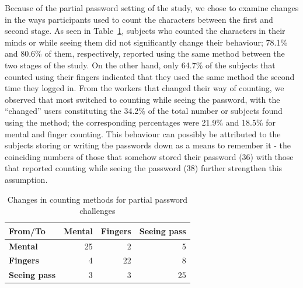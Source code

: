     Because of the partial password setting of the study, we chose to examine changes in the ways participants used to count the characters between the first and second stage. As seen in Table~\ref{tab:counting_changes}, subjects who counted the characters in their minds or while seeing them did not significantly change their behaviour; 78.1\% and 80.6\% of them, respectively, reported using the same method between the two stages of the study. On the other hand, only 64.7\% of the subjects that counted using their fingers indicated that they used the same method the second time they logged in. From the workers that changed their way of counting, we observed that most switched to counting while seeing the password, with the ``changed'' users constituting the 34.2\% of the total number or subjects found using the method; the corresponding percentages were 21.9\% and 18.5\% for mental and finger counting. This behaviour can possibly be attributed to the subjects storing or writing the passwords down as a means to remember it - the coinciding numbers of those that somehow stored their password (36) with those that reported counting while seeing the password (38) further strengthen this assumption.


    \begin{table}[htpb]
      \centering
      \small
      \begin{tabular}{l rrr}
      \toprule
      \textbf{From/To} & \textbf{Mental} & \textbf{Fingers} & \textbf{Seeing pass} \\
      \midrule
       \textbf{Mental} & 25 & 2 & 5 \\
       \textbf{Fingers} & 4 & 22 & 8 \\
       \textbf{Seeing pass} & 3 & 3 & 25 \\
      \bottomrule
      \end{tabular}
      \caption{Changes in counting methods for partial password challenges}
      \label{tab:counting_changes}
    \end{table}

